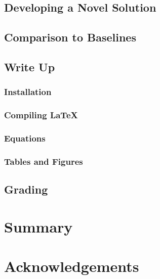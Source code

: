 \documentclass[10pt,conference,compsocconf]{IEEEtran}
\begin{document}
\subsection{Developing a Novel Solution}

\subsection{Comparison to Baselines}

\subsection{Write Up}



\subsubsection{Installation}

\subsubsection{Compiling \LaTeX{}}

\subsubsection{Equations}

\subsubsection{Tables and Figures}

\subsection{Grading}

\section{Summary}

\section*{Acknowledgements}




\end{document}
